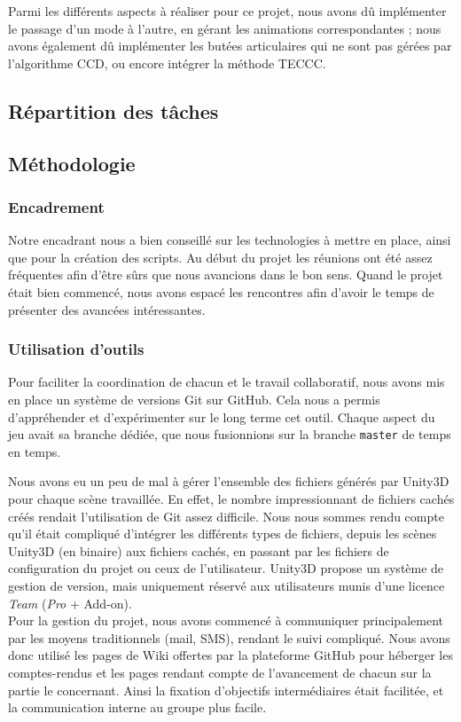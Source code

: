 \documentclass[a4paper,11pt]{article}
\begin{document}
Parmi les différents aspects à réaliser pour ce projet, nous avons dû implémenter le passage d'un mode à l'autre, en gérant les animations correspondantes ; nous avons également dû implémenter les butées articulaires qui ne sont pas gérées par l'algorithme CCD, ou encore intégrer la méthode TECCC. 


\subsection{Répartition des tâches}
\subsection{Méthodologie}
\subsubsection{Encadrement}
Notre encadrant nous a bien conseillé sur les technologies à mettre en place, ainsi que pour la création des scripts. Au début du projet les réunions ont été assez fréquentes afin d'être sûrs que nous avancions dans le bon sens. Quand le projet était bien commencé, nous avons espacé les rencontres afin d'avoir le temps de présenter des avancées intéressantes. 

\subsubsection{Utilisation d'outils}
Pour faciliter la coordination de chacun et le travail collaboratif, nous avons mis en place un système de versions Git sur GitHub. Cela nous a permis d'appréhender et d'expérimenter sur le long terme cet outil. Chaque aspect du jeu avait sa branche dédiée, que nous fusionnions sur la branche \texttt{master} de temps en temps. 

Nous avons eu un peu de mal à gérer l'ensemble des fichiers générés par Unity3D pour chaque scène travaillée. En effet, le nombre impressionnant de fichiers cachés créés rendait l'utilisation de Git assez difficile. Nous nous sommes rendu compte qu'il était compliqué d'intégrer les différents types de fichiers, depuis les scènes Unity3D (en binaire) aux fichiers cachés, en passant par les fichiers de configuration du projet ou ceux de l'utilisateur. Unity3D propose un système de gestion de version, mais uniquement réservé aux utilisateurs munis d'une licence \textit{Team} (\textit{Pro} + Add-on). \\


Pour la gestion du projet, nous avons commencé à communiquer principalement par les moyens traditionnels (mail, SMS), rendant le suivi compliqué. Nous avons donc utilisé les pages de Wiki offertes par la plateforme GitHub pour héberger les comptes-rendus et les pages rendant compte de l'avancement de chacun sur la partie le concernant. Ainsi la fixation d'objectifs intermédiaires était facilitée, et la communication interne au groupe plus facile.  
\end{document}
